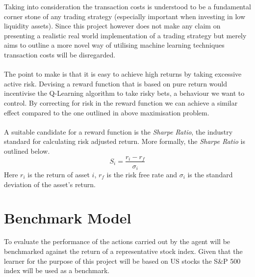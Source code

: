 \documentclass[dvips,12pt]{article}
\begin{document}
Taking into consideration the transaction costs is understood to be a fundamental corner stone of any trading strategy (especially important when investing in low liquidity assets). Since this project however does not make any claim on presenting a realistic real world implementation of a trading strategy but merely aims to outline a more novel way of utilising machine learning techniques transaction costs will be disregarded.
\\\\
The point to make is that it is easy to achieve high returns by taking excessive active risk. Devising a reward function that is based on pure return would incentivise the Q-Learning algorithm to take risky bets, a behaviour we want to control. 
By correcting for risk in the reward function we can achieve a similar effect compared to the one outlined in above maximisation problem.
\\\\
A suitable candidate for a reward function is the \emph{Sharpe Ratio}, the industry standard for calculating risk adjusted return. More formally, the \emph{Sharpe Ratio} is outlined below.
\begin{equation}
	S_i = \frac{r_i - r_f}{\sigma_i}
\end{equation}
Here $r_i$ is the return of asset $i$, $r_f$ is the risk free rate and $\sigma_i$ is the standard deviation of the asset's return.

\section{Benchmark Model}
To evaluate the performance of the actions carried out by the agent will be benchmarked against the return of a representative stock index. Given that the learner for the purpose of this project will be based on US stocks the S\&P 500 index will be used as a benchmark.
\end{document}
